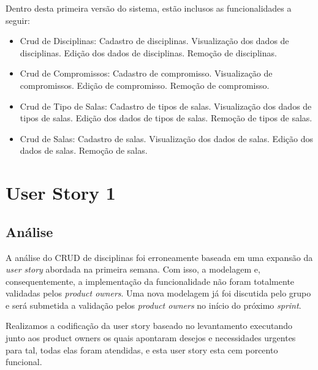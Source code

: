 \documentclass{abnt}
\begin{document}
		Dentro desta primeira versão do sistema, estão inclusos as funcionalidades a seguir:
			\begin{itemize}
			\item Crud de Disciplinas:
			\subitem Cadastro de disciplinas.
			\subitem Visualização dos dados de disciplinas.
			\subitem Edição dos dados de disciplinas.
			\subitem Remoção de disciplinas.
			
			\item Crud de Compromissos:
			\subitem Cadastro de compromisso.
			\subitem Visualização de compromissos.
			\subitem Edição de compromisso.
			\subitem Remoção de compromisso.
			
			\item Crud de Tipo de Salas:
			\subitem Cadastro de tipos de salas.
			\subitem Visualização dos dados de tipos de salas.
			\subitem Edição dos dados de tipos de salas.
			\subitem Remoção de tipos de salas.
			
			\item Crud de Salas:
			\subitem Cadastro de salas.
			\subitem Visualização dos dados de salas.
			\subitem Edição dos dados de salas.
			\subitem Remoção de salas.

			\end{itemize}

	\clearpage
	\section{User Story 1}
	\subsection{Análise}
		A análise do CRUD de disciplinas foi erroneamente baseada em uma expansão da \emph{user story} abordada na primeira semana. Com isso, a modelagem e, consequentemente, a implementação da funcionalidade não foram totalmente validadas pelos \emph{product owners}.
		Uma nova modelagem já foi discutida pelo grupo e será submetida a validação pelos \emph{product owners} no início do próximo \emph{sprint}.
		
		Realizamos a codificação da user story baseado no levantamento executando junto aos product owners os quais apontaram desejos e necessidades urgentes para tal, todas elas foram atendidas, e esta user story esta cem porcento funcional. 
	
\end{document}
